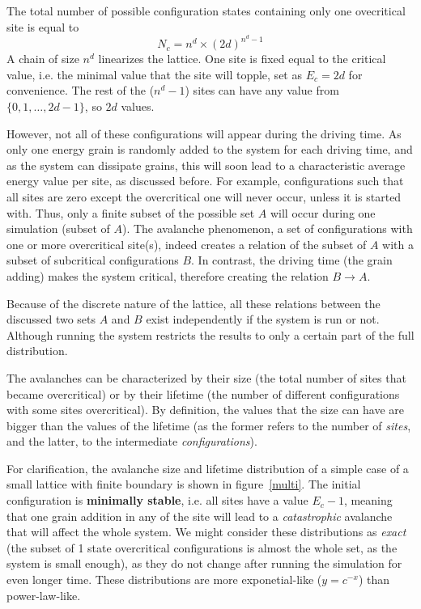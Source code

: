 The total number of possible configuration states containing only one ovecritical site is equal to
\[
N_c=n^d\times (2d)^{n^d-1}
\]
A chain of size $n^d$ linearizes the lattice. One site is fixed equal to the critical value, i.e. the minimal value that the site will topple, set as $E_c=2d$ for convenience. The rest of the ($n^d-1$) sites can have any value from $\{0,1, \ldots, 2d-1\}$, so $2d$ values.

However, not all of these configurations will appear during the driving time. As only one energy grain is randomly added to the system for each driving time,
and as the system can dissipate grains, this will soon lead to a characteristic average energy value per site, as discussed before. For example, configurations such that all sites are zero except the overcritical one will never occur, unless it is started with. Thus, only a finite subset of the possible set $A$ will occur during one simulation (subset of $A$).
The avalanche phenomenon, a set of configurations with one or more overcritical site(s), indeed creates a relation of the subset of $A$ with a subset of subcritical configurations $B$. In contrast, the driving time (the grain adding) makes the system critical, therefore creating the relation $B \to A$.

Because of the discrete nature of the lattice, all these relations between the discussed two sets $A$ and $B$ exist independently if the system is run or not.
Although running the system restricts the results to only a certain part of the full distribution.

The avalanches can be characterized by their size (the total number of sites that became overcritical)
or by their lifetime (the number of different configurations with some sites overcritical). By definition,
the values that the size can have are bigger than the values of the lifetime (as the former refers to the number of \emph{sites}, and the latter, to the intermediate \emph{configurations}).

For clarification, the avalanche size and lifetime distribution of a simple case of a small lattice with finite boundary is shown in figure~\ref{multi}.
The initial configuration is \textbf{minimally stable}, i.e. all sites have a value $E_c-1$, meaning that one grain addition in any of the site will lead to a \emph{catastrophic} avalanche that will affect the whole system.
We might consider these distributions as \emph{exact} (the subset of 1 state overcritical configurations is almost the whole set, as the system is small enough),
as they do not change after running the simulation for even longer time.
These distributions are more exponetial-like ($y=c^{-x}$) than power-law-like.

